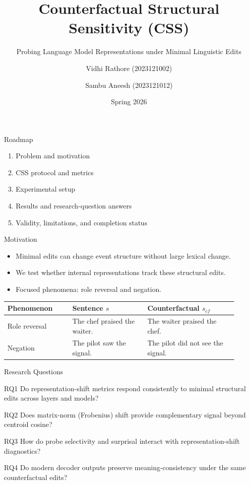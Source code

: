 \documentclass[aspectratio=169,11pt]{beamer}
\title{Counterfactual Structural Sensitivity (CSS)}
\subtitle{Probing Language Model Representations under Minimal Linguistic Edits}
\author[V. Rathore \& S. Aneesh]{Vidhi Rathore (2023121002) \and Sambu Aneesh (2023121012)}
\date{Spring 2026}
\begin{document}
\begin{frame}
  \titlepage
\end{frame}

\begin{frame}{Roadmap}
\begin{enumerate}
  \item Problem and motivation
  \item CSS protocol and metrics
  \item Experimental setup
  \item Results and research-question answers
  \item Validity, limitations, and completion status
\end{enumerate}
\end{frame}

\begin{frame}{Motivation}
\begin{itemize}
  \item Minimal edits can change event structure without large lexical change.
  \item We test whether internal representations track these structural edits.
  \item Focused phenomena: role reversal and negation.
\end{itemize}
\vspace{0.4em}
\begin{table}
\centering
\small
\begin{tabular}{p{0.26\linewidth}p{0.30\linewidth}p{0.36\linewidth}}
\toprule
\textbf{Phenomenon} & \textbf{Sentence \(s\)} & \textbf{Counterfactual \(s_{cf}\)} \\
\midrule
Role reversal & The chef praised the waiter. & The waiter praised the chef. \\
Negation & The pilot saw the signal. & The pilot did not see the signal. \\
\bottomrule
\end{tabular}
\end{table}
\end{frame}

\begin{frame}{Research Questions}
\begin{block}{RQ1}
Do representation-shift metrics respond consistently to minimal structural edits across layers and models?
\end{block}
\begin{block}{RQ2}
Does matrix-norm (Frobenius) shift provide complementary signal beyond centroid cosine?
\end{block}
\begin{block}{RQ3}
How do probe selectivity and surprisal interact with representation-shift diagnostics?
\end{block}
\begin{block}{RQ4}
Do modern decoder outputs preserve meaning-consistency under the same counterfactual edits?
\end{block}
\end{frame}
\end{document}
